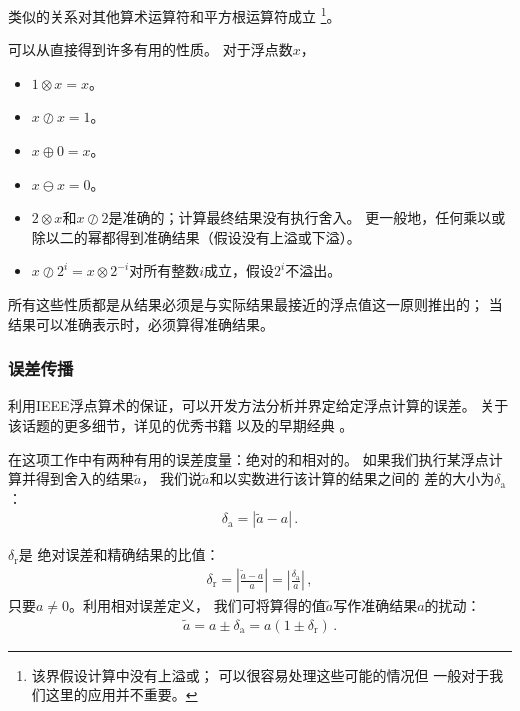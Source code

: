 类似的关系对其他算术运算符和平方根运算符成立
\footnote{该界假设计算中没有上溢或\protect{}；
    可以很容易处理这些可能的情况\citep[p.56]{doi:10.1137/1.9780898718027}但
    一般对于我们这里的应用并不重要。}。

可以从直接得到许多有用的性质。
对于浮点数$x$，
\begin{itemize}
    \item $1\otimes x=x$。
    \item $x\oslash x=1$。
    \item $x\oplus 0=x$。
    \item $x\ominus x=0$。
    \item $2\otimes x$和$x\oslash 2$是准确的；计算最终结果没有执行舍入。
          更一般地，任何乘以或除以二的幂都得到准确结果（假设没有上溢或下溢）。
    \item $x\oslash 2^i=x\otimes 2^{-i}$对所有整数$i$成立，假设$2^i$不溢出。
\end{itemize}

所有这些性质都是从结果必须是与实际结果最接近的浮点值这一原则推出的；
当结果可以准确表示时，必须算得准确结果。

\subsubsection*{误差传播}
利用IEEE浮点算术的保证，可以开发方法分析并界定给定浮点计算的误差。
关于该话题的更多细节，详见\citet{doi:10.1137/1.9780898718027}的优秀书籍
以及\citet{10.5555/1096474}的早期经典
。

在这项工作中有两种有用的误差度量：绝对的和相对的。
如果我们执行某浮点计算并得到舍入的结果$\tilde{a}$，
我们说$\tilde{a}$和以实数进行该计算的结果之间的
差的大小为$\delta_{\mathrm{a}}$：
\begin{align*}
    \delta_{\mathrm{a}}=|\tilde{a}-a|\, .
\end{align*}

$\delta_{\mathrm{r}}$是
绝对误差和精确结果的比值：
\begin{align}\label{eq:3.9}
    \delta_{\mathrm{r}}=\left|\frac{\tilde{a}-a}{a}\right|=\left|\frac{\delta_{\mathrm{a}}}{a}\right|\, ,
\end{align}
只要$a\neq0$。利用相对误差定义，
我们可将算得的值$\tilde{a}$写作准确结果$a$的扰动：
\begin{align*}
    \tilde{a}=a\pm\delta_{\mathrm{a}}=a(1\pm\delta_{\mathrm{r}})\, .
\end{align*}

